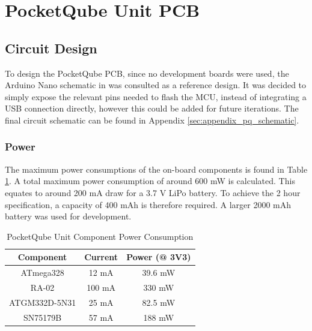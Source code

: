 \graphicspath{{./figures}}

\section{PocketQube Unit PCB}
\subsection{Circuit Design}
To design the PocketQube PCB, since no development boards were used, the Arduino Nano schematic in \cite{design-arduinoNano} was consulted as a reference design. It was decided to simply expose the relevant pins needed to flash the MCU, instead of integrating a USB connection directly, however this could be added for future iterations. The final circuit schematic can be found in Appendix \ref{sec:appendix_pq_schematic}.

\subsubsection{Power}
The maximum power consumptions of the on-board components is found in Table \ref{tab:pqunit_component_consumption}. A total maximum power consumption of around 600 mW is calculated. This equates to around 200 mA draw for a 3.7 V LiPo battery. To achieve the 2 hour specification, a capacity of 400 mAh is therefore required. A larger 2000 mAh battery was used for development.
\begin{table}[!htb]
  \centering
  \renewcommand{\arraystretch}{1.2}
  \begin{tabular}{ |c|c|c| }
  \hline
  \textbf{Component}        & \textbf{Current}        & \textbf{Power (@ 3V3)}      \\ \hline 
  ATmega328                 & 12 mA                   & 39.6 mW                     \\ \hline 
  RA-02                     & 100 mA                  & 330 mW                      \\ \hline 
  ATGM332D-5N31             & 25 mA                   & 82.5 mW                     \\ \hline
  SN75179B                  & 57 mA                   & 188 mW                      \\ \hline
  \end{tabular}
  \caption{PocketQube Unit Component Power Consumption}
  \label{tab:pqunit_component_consumption}
\end{table}

